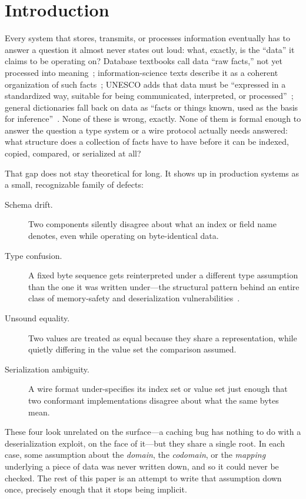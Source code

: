 \section{Introduction}
\label{sec:intro}

Every system that stores, transmits, or processes information eventually
has to answer a question it almost never states out loud: what, exactly,
is the ``data'' it claims to be operating on? Database textbooks call data
``raw facts,'' not yet processed into meaning~\autocite{rob2013};
information-science texts describe it as a coherent organization of such
facts~\autocite{ratzan2004}; UNESCO adds that data must be ``expressed in
a standardized way, suitable for being communicated, interpreted, or
processed''~\autocite{unesco2008}; general dictionaries fall back on data
as ``facts or things known, used as the basis for inference''~\autocite{websters1934}.
None of these is wrong, exactly. None of them is formal enough to answer
the question a type system or a wire protocol actually needs answered:
what structure does a collection of facts have to have before it can be
indexed, copied, compared, or serialized at all?

That gap does not stay theoretical for long. It shows up in production
systems as a small, recognizable family of defects:

\begin{description}
  \item[Schema drift.]
    Two components silently disagree about what an index or field name
    denotes, even while operating on byte-identical data.
  \item[Type confusion.]
    A fixed byte sequence gets reinterpreted under a different type
    assumption than the one it was written under---the structural pattern
    behind an entire class of memory-safety and deserialization
    vulnerabilities~\autocite{cwe843}.
  \item[Unsound equality.]
    Two values are treated as equal because they share a representation,
    while quietly differing in the value set the comparison assumed.
  \item[Serialization ambiguity.]
    A wire format under-specifies its index set or value set just enough
    that two conformant implementations disagree about what the same bytes
    mean.
\end{description}

These four look unrelated on the surface---a caching bug has nothing to do
with a deserialization exploit, on the face of it---but they share a
single root. In each case, some assumption about the \emph{domain}, the
\emph{codomain}, or the \emph{mapping} underlying a piece of data was
never written down, and so it could never be checked. The rest of this
paper is an attempt to write that assumption down once, precisely enough
that it stops being implicit.

